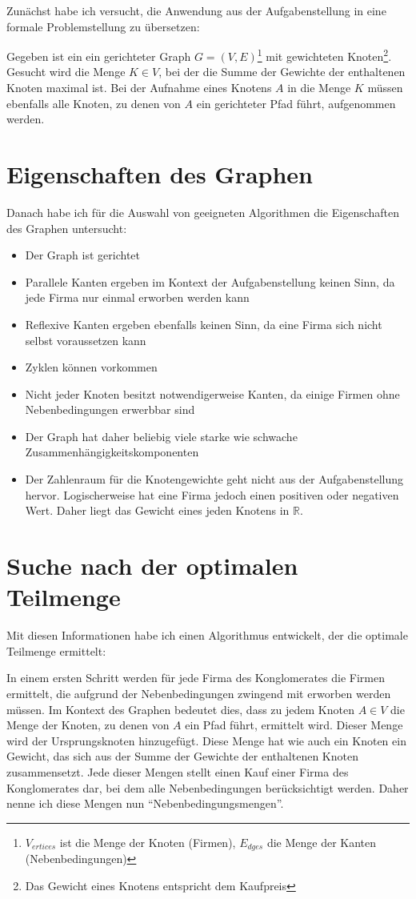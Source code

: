 Zunächst habe ich versucht, die Anwendung aus der Aufgabenstellung in eine formale Problemstellung zu übersetzen:
\begin{displayquote}
	Gegeben ist ein ein gerichteter Graph \(G=(V,E)\)\footnote{\(V_{ertices}\) ist die Menge der Knoten (Firmen), \(E_{dges}\) die Menge der Kanten (Nebenbedingungen)} mit gewichteten Knoten\footnote{Das Gewicht eines Knotens entspricht dem Kaufpreis}. Gesucht wird die Menge \(K \in V\), bei der die Summe der Gewichte der enthaltenen Knoten maximal ist. Bei der Aufnahme eines Knotens  \(A\) in die Menge \(K\) müssen ebenfalls alle Knoten, zu denen von \(A\) ein gerichteter Pfad führt, aufgenommen werden.
\end{displayquote}

\section{Eigenschaften des Graphen}
Danach habe ich für die Auswahl von geeigneten Algorithmen die Eigenschaften des Graphen untersucht:
\begin{itemize}
	\item Der Graph ist gerichtet
	\item Parallele Kanten ergeben im Kontext der Aufgabenstellung keinen Sinn, da jede Firma nur einmal erworben werden kann
	\item Reflexive Kanten ergeben ebenfalls keinen Sinn, da eine Firma sich nicht selbst voraussetzen kann
	\item Zyklen können vorkommen
	\item Nicht jeder Knoten besitzt notwendigerweise Kanten, da einige Firmen ohne Nebenbedingungen erwerbbar sind
	\item Der Graph hat daher beliebig viele starke wie schwache Zusammenhängigkeitskomponenten
	\item Der Zahlenraum für die Knotengewichte geht nicht aus der Aufgabenstellung hervor. Logischerweise hat eine Firma jedoch einen positiven oder negativen Wert. Daher liegt das Gewicht eines jeden Knotens in \(\mathbb{R}\).
\end{itemize}

\section{Suche nach der optimalen Teilmenge}
Mit diesen Informationen habe ich einen Algorithmus entwickelt, der die optimale Teilmenge ermittelt:

In einem ersten Schritt werden für jede Firma des Konglomerates die Firmen ermittelt, die aufgrund der Nebenbedingungen zwingend mit erworben werden müssen. Im Kontext des Graphen bedeutet dies, dass zu jedem Knoten \(A \in V\) die Menge der Knoten, zu denen von \(A\) ein Pfad führt, ermittelt wird. 
Dieser Menge wird der Ursprungsknoten hinzugefügt. Diese Menge hat wie auch ein Knoten ein Gewicht, das sich aus der Summe der Gewichte der enthaltenen Knoten zusammensetzt. Jede dieser Mengen stellt einen Kauf einer Firma des Konglomerates dar, bei dem alle Nebenbedingungen berücksichtigt werden. Daher nenne ich diese Mengen nun "`Nebenbedingungsmengen"'.

